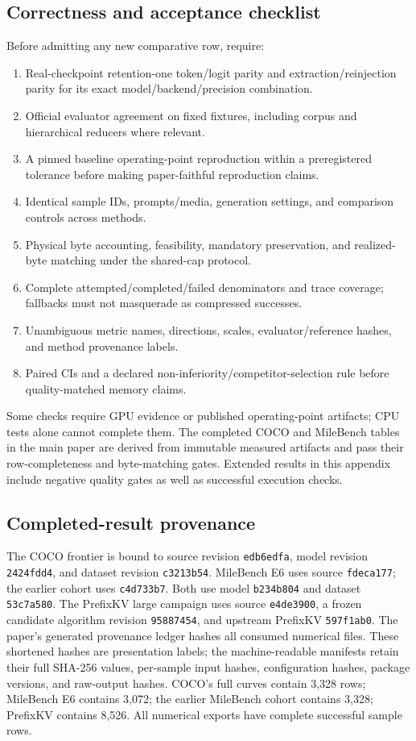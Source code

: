 \subsection{Correctness and acceptance checklist}
Before admitting any new comparative row, require:
\begin{enumerate}
\item Real-checkpoint retention-one token/logit parity and extraction/reinjection
parity for its exact model/backend/precision combination.
\item Official evaluator agreement on fixed fixtures, including corpus and
hierarchical reducers where relevant.
\item A pinned baseline operating-point reproduction within a preregistered
tolerance before making paper-faithful reproduction claims.
\item Identical sample IDs, prompts/media, generation settings, and comparison
controls across methods.
\item Physical byte accounting, feasibility, mandatory preservation, and
realized-byte matching under the shared-cap protocol.
\item Complete attempted/completed/failed denominators and trace coverage;
fallbacks must not masquerade as compressed successes.
\item Unambiguous metric names, directions, scales, evaluator/reference hashes,
and method provenance labels.
\item Paired CIs and a declared non-inferiority/competitor-selection rule before
quality-matched memory claims.
\end{enumerate}
Some checks require GPU evidence or published operating-point artifacts; CPU
tests alone cannot complete them. The completed COCO and MileBench tables in
the main paper are derived from immutable measured artifacts and pass their
row-completeness and byte-matching gates. Extended results in this appendix
include negative quality gates as well as successful execution checks.

\subsection{Completed-result provenance}
The COCO frontier is bound to source revision \texttt{edb6edfa}, model revision
\texttt{2424fdd4}, and dataset revision \texttt{c3213b54}. MileBench E6 uses
source \texttt{fdeca177}; the earlier cohort uses \texttt{c4d733b7}.
Both use model \texttt{b234b804} and dataset \texttt{53c7a580}.
The PrefixKV large campaign uses source \texttt{e4de3900}, a frozen candidate
algorithm revision \texttt{95887454}, and upstream PrefixKV \texttt{597f1ab0}.
The paper's generated provenance ledger hashes all consumed numerical files.
These shortened hashes
are presentation labels; the machine-readable manifests retain their full
SHA-256 values, per-sample input hashes, configuration hashes, package versions,
and raw-output hashes. COCO's full curves contain 3,328 rows; MileBench E6
contains 3,072; the earlier MileBench cohort contains 3,328; PrefixKV contains
8,526. All numerical exports have complete successful sample rows.

